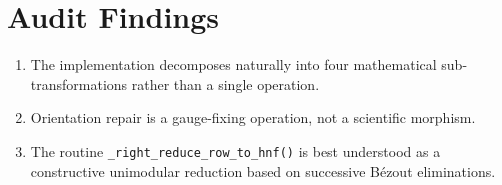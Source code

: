 \section{Audit Findings}

\begin{enumerate}
\item The implementation decomposes naturally into four mathematical
sub-transformations rather than a single operation.
\item Orientation repair is a gauge-fixing operation, not a scientific
morphism.
\item The routine \texttt{\_right\_reduce\_row\_to\_hnf()} is best
understood as a constructive unimodular reduction based on successive
Bézout eliminations.
\end{enumerate}
